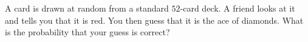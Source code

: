 A card is drawn at random from a standard $52$-card deck. A friend looks at it and tells you that it is red. You then guess that it is the ace of diamonds. What is the probability that your guess is correct?
